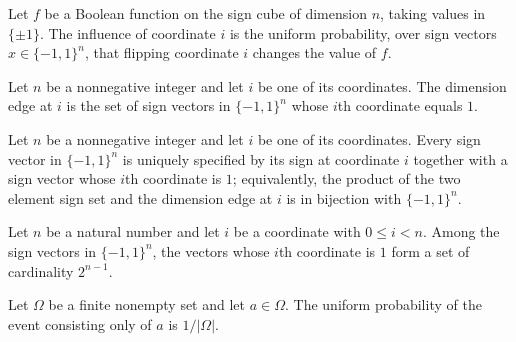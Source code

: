 \begin{definition}
\label{FABL.booleanInfluence}
\leanok
{}
Let $f$ be a Boolean function on the sign cube of dimension $n$, taking values in
$\{\pm1\}$. The influence of coordinate $i$ is the uniform probability, over sign
vectors $x\in\{-1,1\}^n$, that flipping coordinate $i$ changes the value of $f$.
\end{definition}

\begin{definition}
\label{FABL.DimensionEdge}
\leanok
Let $n$ be a nonnegative integer and let $i$ be one of its coordinates. The dimension
edge at $i$ is the set of sign vectors in $\{-1,1\}^n$ whose $i$th coordinate equals $1$.
\end{definition}

\begin{definition}
\label{FABL.signProdDimensionEdgeEquiv}
\leanok
{}
Let $n$ be a nonnegative integer and let $i$ be one of its coordinates. Every sign
vector in $\{-1,1\}^n$ is uniquely specified by its sign at coordinate $i$ together with
a sign vector whose $i$th coordinate is $1$; equivalently, the product of the two
element sign set and the dimension edge at $i$ is in bijection with $\{-1,1\}^n$.
\end{definition}

\begin{theorem}
\label{FABL.card_dimensionEdge}
\leanok
{}
Let $n$ be a natural number and let $i$ be a coordinate with $0\le i<n$. Among the sign
vectors in $\{-1,1\}^n$, the vectors whose $i$th coordinate is $1$ form a set of
cardinality $2^{n-1}$.
\end{theorem}

\begin{theorem}
\label{FABL.uniformProbability_eq_singleton}
\leanok
{}
Let $\Omega$ be a finite nonempty set and let $a\in\Omega$. The uniform probability
of the event consisting only of $a$ is $1/|\Omega|$.
\end{theorem}

